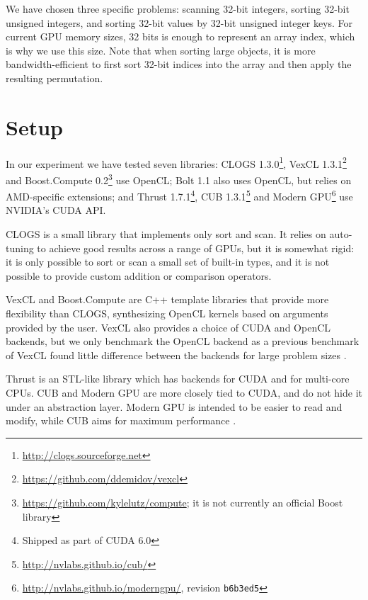 \documentclass{ws-ppl}
\begin{document}
We have chosen three specific problems: scanning 32-bit integers, sorting
32-bit unsigned integers, and sorting 32-bit values by 32-bit unsigned integer
keys. For current GPU memory sizes, 32 bits is enough to represent
an array index, which is why we use this size. Note that when sorting large
objects, it is more bandwidth-efficient to first sort 32-bit indices into the
array and then apply the resulting permutation.

\section{Setup}
In our experiment we have tested seven libraries:
CLOGS 1.3.0\footnote{\url{http://clogs.sourceforge.net}},
VexCL 1.3.1\footnote{\url{https://github.com/ddemidov/vexcl}} and
Boost.Compute 0.2\footnote{\url{https://github.com/kylelutz/compute}; it is
not currently an official Boost library} use OpenCL;
Bolt 1.1 also uses OpenCL, but relies on
AMD-specific extensions; and Thrust 1.7.1\footnote{Shipped as part of CUDA
6.0}, CUB 1.3.1\footnote{\url{http://nvlabs.github.io/cub/}} and
Modern GPU\footnote{\url{http://nvlabs.github.io/moderngpu/}, revision
\texttt{b6b3ed5}} use NVIDIA's CUDA API.

CLOGS is a small library that implements only sort and scan. It relies on
auto-tuning to achieve good results across a range of GPUs, but it is somewhat
rigid: it is only possible to sort or scan a small set of built-in types, and
it is not possible to provide custom addition or comparison operators.

VexCL and Boost.Compute are C++ template libraries that provide more
flexibility than CLOGS, synthesizing OpenCL kernels based on arguments
provided by the user. VexCL also provides a choice
of CUDA and OpenCL backends, but we only benchmark the OpenCL backend as a
previous benchmark of VexCL found little difference between the backends
for large problem sizes \cite{opencl-libraries}.

Thrust is an STL-like library which has backends for CUDA and for multi-core
CPUs. CUB and Modern GPU are more closely tied to CUDA, and do not hide it
under an abstraction layer. Modern GPU is intended to be easier to read and
modify, while CUB aims for maximum performance \cite{cub}.
\end{document}
